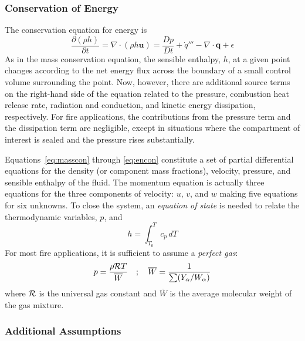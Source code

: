 \documentclass[graybox]{svmult}
\begin{document}
\subsubsection{Conservation of Energy}

The conservation equation for energy is
\begin{equation}
\frac{\partial (\rho h)}{\partial t} = \nabla \cdot (\rho h \mathbf{u}) = \frac{Dp}{Dt} + \dot{q}''' - \nabla \cdot \mathbf{q} + \epsilon
\label{eq:encon}
\end{equation}
As in the mass conservation equation, the sensible enthalpy, $h$, at a given point changes according to the net energy flux across the boundary of a small control volume surrounding the point. Now, however, there are additional source terms on the right-hand side of the equation related to the pressure, combustion heat release rate, radiation and conduction, and kinetic energy dissipation, respectively. For fire applications, the contributions from the pressure term and the dissipation term are negligible, except in situations where the compartment of interest is sealed and the pressure rises substantially.

Equations~\ref{eq:masscon} through \ref{eq:encon} constitute a set of partial differential equations for the density (or component mass fractions), velocity, pressure, and sensible enthalpy of the fluid. The momentum equation is actually three equations for the three components of velocity: $u$, $v$, and $w$ making five equations for six unknowns. To close the system, an {\em equation of state} is needed to relate the thermodynamic variables, $p$, and
\begin{equation}
h = \int_{T_0}^T c_p \, dT
\label{eq:hdef}
\end{equation}
For most fire applications, it is sufficient to assume a {\em perfect gas}:
\begin{equation}
p = \frac{\rho {\cal R} T}{\overline{W}} \quad ; \quad \overline{W} = \frac{1}{\sum (Y_\alpha / W_\alpha)}
\label{eq:pgas}
\end{equation}
where ${\cal R}$ is the universal gas constant and $\overline{W}$ is the average molecular weight of the gas mixture.


\subsubsection{Additional Assumptions}
\end{document}
